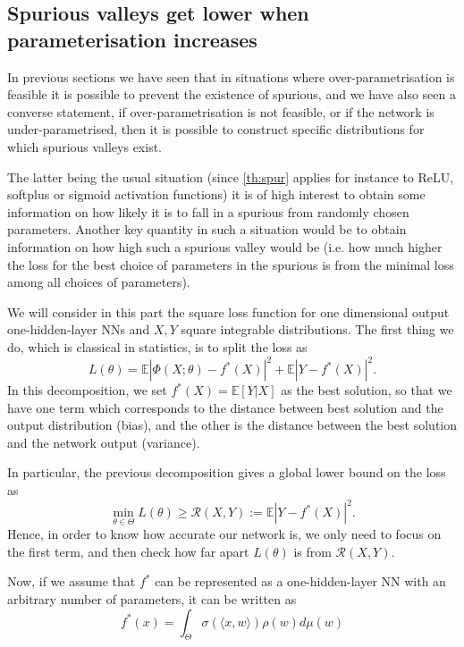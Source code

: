 \documentclass[11pt]{article} %
\begin{document}
\subsection{Spurious valleys get lower when parameterisation increases}
In previous sections we have seen that in situations where over-parametrisation is feasible it is possible to prevent the existence of spurious, and we have also seen a converse statement, if over-parametrisation is not feasible, or if the network is under-parametrised, then it is possible to construct specific distributions for which spurious valleys exist.
\par
The latter being the usual situation (since \ref{th:spur} applies for instance to ReLU, softplus or sigmoid activation functions) it is of high interest to obtain some information on how likely it is to fall in a spurious from randomly chosen parameters. Another key quantity in such a situation would be to obtain information on how high such a spurious valley would be (i.e. how much higher the loss for the best choice of parameters in the spurious is from the minimal loss among all choices of parameters).
\par
We will consider in this part the square loss function for one dimensional output one-hidden-layer NNs and $X,Y$ square integrable distributions. The first thing we do, which is classical in statistics, is to split the loss as
\begin{equation}
	L(\theta) = \mathbb{E}|\Phi(X; \theta) - f^*(X)|^2 + \mathbb{E}|Y-f^*(X)|^2.
\end{equation} 
In this decomposition, we set $f^*(X) = \mathbb{E}[Y|X]$ as the best solution, so that we have one term which corresponds to the distance between best solution and the output distribution (bias), and the other is the distance between the best solution and the network output (variance).
\par
In particular, the previous decomposition gives a global lower bound on the loss as
\begin{equation}
	\min_{\theta\in\Theta} L(\theta) \geq \mathcal{R}(X,Y) := \mathbb{E}| Y - f^*(X)|^2.
\end{equation}
Hence, in order to know how accurate our network is, we only need to focus on the first term, and then check how far apart $L(\theta)$ is from $\mathcal{R}(X,Y)$.
\par
Now, if we assume that $f^*$ can be represented as a one-hidden-layer NN with an arbitrary number of parameters, it can be written as
\begin{equation}\label{eq:fid}
	f^*(x) = \int_\Theta \sigma(\langle x, w\rangle) \rho(w) d \mu(w)
\end{equation}
\end{document}
